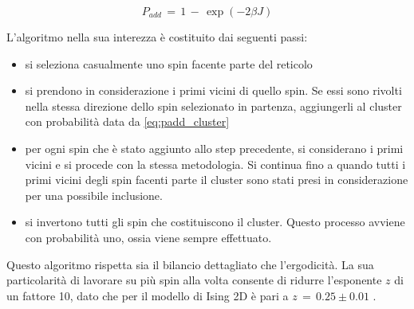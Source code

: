 \begin{equation}
    P_{add}\,=\,1\,-\,\exp{\left(-2\beta J\right)}
    \label{eq: padd_cluster}
\end{equation}

L'algoritmo nella sua interezza è costituito dai seguenti passi:

\begin{itemize}[label=$\diamond$] 
    \item si seleziona casualmente uno spin facente parte del reticolo
    \item si prendono in considerazione i primi vicini di quello spin. Se essi sono rivolti nella stessa direzione dello spin 
    selezionato in partenza, aggiungerli al cluster con probabilità data da \eqref{eq:padd_cluster}
    \item per ogni spin che è stato aggiunto allo step precedente, si considerano i primi vicini e si procede con la stessa metodologia. 
    Si continua fino a quando tutti i primi vicini degli spin facenti parte il cluster sono stati presi in considerazione per una possibile 
    inclusione.
    \item si invertono tutti gli spin che costituiscono il cluster. Questo processo avviene con probabilità uno, ossia viene sempre effettuato.
\end{itemize}

Questo algoritmo rispetta sia il bilancio dettagliato che l'ergodicità. La sua particolarità di lavorare su più spin alla volta consente di 
ridurre l'esponente $z$ di un fattore 10, dato che per il modello di Ising 2D è pari a $z\,=\,0.25 \pm 0.01$ \cite{MCM}.
